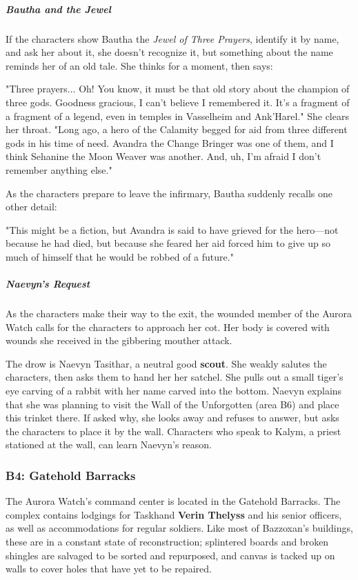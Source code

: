 \documentclass[10pt,a4paper,twoside,fancy,bg=print,twocolumn,openany,nodeprecatedcode]{dndbook}
\begin{document}
\subparagraph{Bautha and the Jewel}
If the characters show Bautha the \textit{Jewel of Three Prayers}, identify it by name, and ask her about it, she doesn't recognize it, but something about the name reminds her of an old tale. She thinks for a moment, then says:

\begin{DndReadAloud}{}
"Three prayers... Oh! You know, it must be that old story about the champion of three gods. Goodness gracious, I can't believe I remembered it. It's a fragment of a fragment of a legend, even in temples in Vasselheim and Ank'Harel." She clears her throat. "Long ago, a hero of the Calamity begged for aid from three different gods in his time of need. Avandra the Change Bringer was one of them, and I think Sehanine the Moon Weaver was another. And, uh, I'm afraid I don't remember anything else."

\end{DndReadAloud}

As the characters prepare to leave the infirmary, Bautha suddenly recalls one other detail:

\begin{DndReadAloud}{}
"This might be a fiction, but Avandra is said to have grieved for the hero—not because he had died, but because she feared her aid forced him to give up so much of himself that he would be robbed of a future."

\end{DndReadAloud}

\subparagraph{Naevyn's Request}
As the characters make their way to the exit, the wounded member of the Aurora Watch calls for the characters to approach her cot. Her body is covered with wounds she received in the gibbering mouther attack.

The drow is Naevyn Tasithar, a neutral good \textbf{scout}. She weakly salutes the characters, then asks them to hand her her satchel. She pulls out a small tiger's eye carving of a rabbit with her name carved into the bottom. Naevyn explains that she was planning to visit the Wall of the Unforgotten (area B6) and place this trinket there. If asked why, she looks away and refuses to answer, but asks the characters to place it by the wall. Characters who speak to Kalym, a priest stationed at the wall, can learn Naevyn's reason.

\subsubsection{B4: Gatehold Barracks}
The Aurora Watch's command center is located in the Gatehold Barracks. The complex contains lodgings for Taskhand \textbf{Verin Thelyss} and his senior officers, as well as accommodations for regular soldiers. Like most of Bazzoxan's buildings, these are in a constant state of reconstruction; splintered boards and broken shingles are salvaged to be sorted and repurposed, and canvas is tacked up on walls to cover holes that have yet to be repaired.
\end{document}
